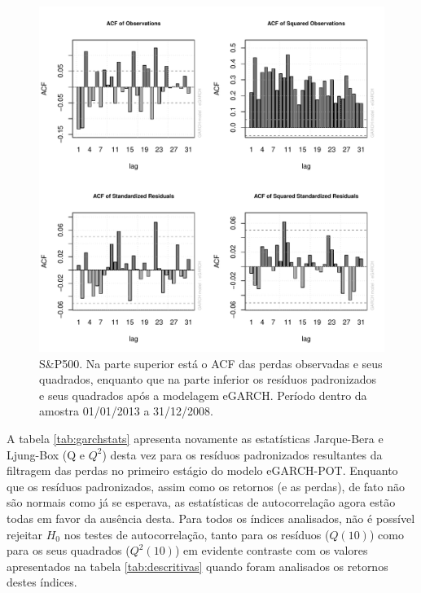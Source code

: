 \documentclass[1p]{elsarticle}
\theoremstyle{definition}
\begin{document}
\begin{figure}[H]
	\centering
	\includegraphics[width=1\linewidth]{figs/artigo-acf-SP500}
	\caption{S\&P500. Na parte superior está o ACF das perdas observadas e seus quadrados, enquanto que na parte inferior os resíduos padronizados e seus quadrados após a modelagem eGARCH. Período dentro da amostra 01/01/2013 a 31/12/2008.}
	\label{fig:artigo-acf-sp500}
\end{figure}

A tabela \ref{tab:garchstats} apresenta novamente as estatísticas Jarque-Bera e Ljung-Box (Q e $Q^2$) desta vez para os resíduos padronizados resultantes da filtragem das perdas no primeiro estágio do modelo eGARCH-POT. Enquanto que os resíduos padronizados, assim como os retornos (e as perdas), de fato não são normais como já se esperava, as estatísticas de autocorrelação agora estão todas em favor da ausência desta. Para todos os índices analisados, não é possível rejeitar $H_0$ nos testes de autocorrelação, tanto para os resíduos ($Q(10)$) como para os seus quadrados ($Q^2(10)$) em evidente contraste com os valores apresentados na tabela \ref{tab:descritivas} quando foram analisados os retornos destes índices.



\end{document}

